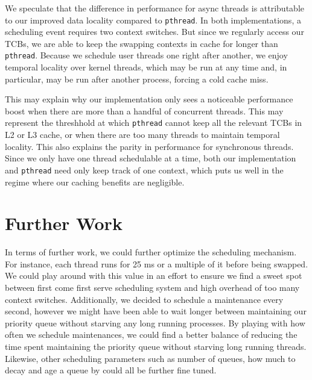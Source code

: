 \documentclass{article}
\begin{document}
We speculate that the difference in performance for async threads is attributable to our improved data locality compared to \verb|pthread|.
In both implementations, a scheduling event requires two context switches.
But since we regularly access our TCBs, we are able to keep the swapping contexts in cache for longer than \verb|pthread|.
Because we schedule user threads one right after another, we enjoy temporal locality over kernel threads, which may be run at any time and, in particular, may be run after another process, forcing a cold cache miss.

This may explain why our implementation only sees a noticeable performance boost when there are more than a handful of concurrent threads.
This may represent the threshhold at which \verb|pthread| cannot keep all the relevant TCBs in L2 or L3 cache, or when there are too many threads to maintain temporal locality.
This also explains the parity in performance for synchronous threads.
Since we only have one thread schedulable at a time, both our implementation and \verb|pthread| need only keep track of one context, which puts us well in the regime where our caching benefits are negligible.

\section{Further Work}
In terms of further work, we could further optimize the scheduling mechanism.
For instance, each thread runs for 25 ms or a multiple of it before being swapped.
We could play around with this value in an effort to ensure we find a sweet spot between first come first serve scheduling system and high overhead of too many context switches.
Additionally, we decided to schedule a maintenance every second, however we might have been able to wait longer between maintaining our priority queue without starving any long running processes.
By playing with how often we schedule maintenances, we could find a better balance of reducing the time spent maintaining the priority queue without starving long running threads.
Likewise, other scheduling parameters such as number of queues, how much to decay and age a queue by could all be further fine tuned.
\end{document}
